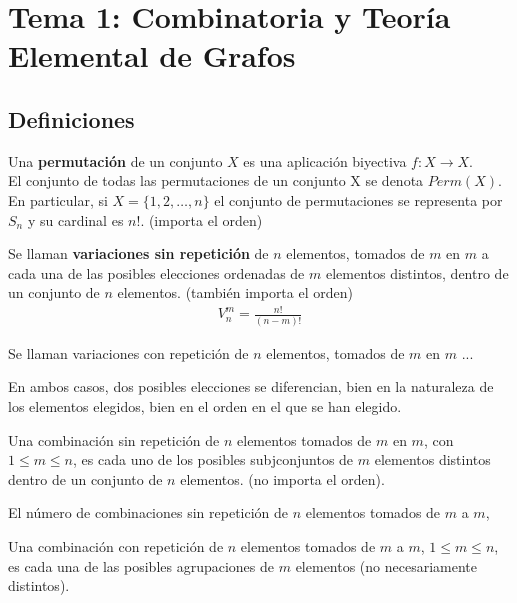 \chapter{Tema 1: Combinatoria y Teoría Elemental de Grafos}


\section{Definiciones}

\begin{definicion}
    Una \textbf{permutación} de un conjunto $X$ es una aplicación biyectiva $f:X\to X$.\\

    El conjunto de todas las permutaciones de un conjunto X se denota $Perm(X)$. En particular, si $X = \{1,2,\dots,n\}$ el conjunto de permutaciones se representa por $S_n$ y su cardinal es $n!$. (importa el orden)
\end{definicion}

\begin{definicion}
    Se llaman \textbf{variaciones sin repetición} de $n$ elementos, tomados de $m$ en $m$ a cada una de las posibles elecciones ordenadas de $m$ elementos distintos, dentro de un conjunto de $n$ elementos. (también importa el orden)
    \begin{align*}
        V_n^m = \frac{n!}{(n-m)!}
    \end{align*}
\end{definicion}

\begin{definicion}
    Se llaman variaciones con repetición de $n$ elementos, tomados de $m$ en $m$ ...
\end{definicion}

En ambos casos, dos posibles elecciones se diferencian, bien en la naturaleza de los elementos elegidos, bien en el orden en el que se han elegido.

\begin{definicion}
    Una combinación sin repetición de $n$ elementos tomados de $m$ en $m$, con $1\leq m \leq n$, es cada uno de los posibles subjconjuntos de $m$ elementos distintos dentro de un conjunto de $n$ elementos. (no importa el orden).
\end{definicion}

El número de combinaciones sin repetición de $n$ elementos tomados de $m$ a $m$, 

\begin{definicion}
    Una combinación con repetición de $n$ elementos tomados de $m$ a $m$, $1\leq m \leq n$,  es cada una de las posibles agrupaciones de $m$ elementos (no necesariamente distintos).
\end{definicion}

